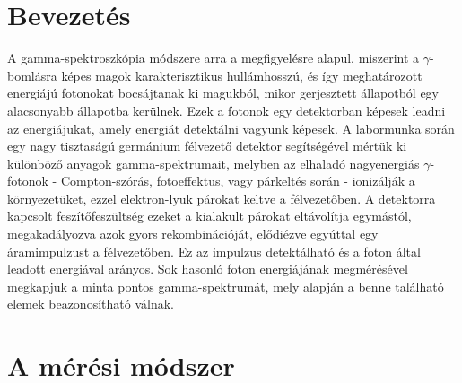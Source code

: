 \begin{multicols}{2}
\section{Bevezetés}
A gamma-spektroszkópia módszere arra a megfigyelésre alapul, miszerint a $\gamma$-bomlásra képes magok karakterisztikus hullámhosszú, és így meghatározott energiájú fotonokat bocsájtanak ki magukból, mikor gerjesztett állapotból egy alacsonyabb állapotba kerülnek. Ezek a fotonok egy detektorban képesek leadni az energiájukat, amely energiát detektálni vagyunk képesek. \newline
A labormunka során egy nagy tisztaságú germánium félvezető detektor segítségével mértük ki különböző anyagok gamma-spektrumait, melyben az elhaladó nagyenergiás $\gamma$-fotonok - Compton-szórás, fotoeffektus, vagy párkeltés során - ionizálják a környezetüket, ezzel elektron-lyuk párokat keltve a félvezetőben. A detektorra kapcsolt feszítőfeszültség ezeket a kialakult párokat eltávolítja egymástól, megakadályozva azok gyors rekombinációját, elődiézve egyúttal egy áramimpulzust a félvezetőben. Ez az impulzus detektálható és a foton által leadott energiával arányos. Sok hasonló foton energiájának megmérésével megkapjuk a minta pontos gamma-spektrumát, mely alapján a benne található elemek beazonosítható válnak.

\section{A mérési módszer}



\end{multicols}
